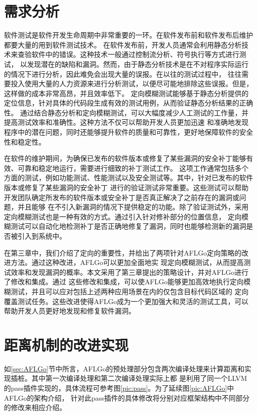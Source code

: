 \documentclass[bachelor]{njupthesis}
\begin{document}
\section{需求分析}
软件测试是软件开发生命周期中非常重要的一环。在软件发布前和软件发布后维护都要大量的用到软件测试技术。
在软件发布前，开发人员通常会利用静态分析技术来查验软件中的错误。这种技术一般通过控制流分析、符号执行等方式进行测试，
以发现潜在的缺陷和漏洞。然而，由于静态分析技术是在不对程序实际运行的情况下进行分析，因此难免会出现大量的误报。在以往的测试过程中，
往往需要投入使用大量的人力资源来进行分析测试，以便尽可能地排除这些误报。但是，这样做的成本非常高昂，并且效率低下。
定向模糊测试能够基于静态分析提供的定位信息，针对具体的代码段生成有效的测试用例，从而验证静态分析结果的正确性。
通过结合静态分析和定向模糊测试，可以大幅度减少人工测试的工作量，并提高测试效率和准确性。这种方法不仅可以帮助开发人员更加迅速
和准确地发现程序中的潜在问题，同时还能够提升软件的质量和可靠性，更好地保障软件的安全性和稳定性。

在软件的维护期间，为确保已发布的软件版本或修复了某些漏洞的安全补丁能够有效、可靠和稳定地运行，需要进行细致的补丁测试工作。
这项工作通常包括多个方面的测试，例如功能测试、性能测试以及安全测试等。其中，针对已发布的软件版本或修复了某些漏洞的安全补丁
进行的验证测试非常重要。这些测试可以帮助开发团队确定所发布的软件版本或安全补丁是否真正解决了之前存在的漏洞或问题，并且能够
在不引入新漏洞的情况下提供稳定的功能。除了验证测试外，采用定向模糊测试也是一种有效的方式。通过引入针对修补部分的位置信息，
定向模糊测试可以自动化地检测补丁是否正确地修复了漏洞，同时也能够检测新的漏洞是否被引入到系统中。

在第三章中，我们介绍了定向的重要性，并给出了两项针对AFLGo定向策略的改进方法。通过这种改进，AFLGo可以更加全面地实
现定向模糊测试，从而提高测试效率和发现漏洞的概率。本文采用了第三章提出的策略设计，并对AFLGo进行了修改和集成。通过
这些修改和集成，可以使AFLGo能够更加高效地执行定向模糊测试，并且可以应对包括上述两种应用场景在内的仅包含目标代码区域的
定向覆盖测试任务。这些改进使得AFLGo成为一个更加强大和灵活的测试工具，可以帮助开发人员更好地发现和修复软件漏洞。

\section{距离机制的改进实现}
如\ref{sec:AFLGo}节中所言，AFLGo的预处理部分包含两次编译处理来计算距离和实现插桩。其中第一次编译处理和第二次编译处理实际上都
是利用了同一个LLVM的pass插件\cite{Pass}实现的，具体流程可参考图\ref{pic:pass}。为了延续图\ref{pic:AFLGo}中AFLGo的架构介绍，
针对此pass插件的具体修改将分别对应框架结构中不同部分的修改来相应介绍。
\end{document}
